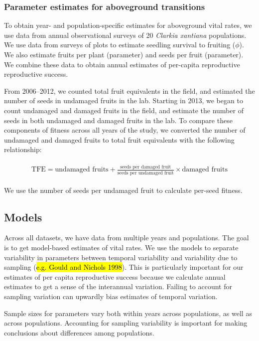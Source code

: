 \documentclass[12pt, oneside, titlepage]{article}   	%
\begin{document}
\subsubsection*{Parameter estimates for aboveground transitions}

To obtain year- and population-specific estimates for aboveground vital rates, we use data from annual observational surveys of 20 \textit{Clarkia xantiana} populations. We use data from surveys of plots to estimate seedling survival to fruiting ($\phi$). We also estimate fruits per plant (parameter) and seeds per fruit (parameter). We combine these data to obtain annual estimates of per-capita reproductive reproductive success.

From 2006--2012, we counted total fruit equivalents in the field, and estimated the number of seeds in undamaged fruits in the lab. Starting in 2013, we began to count undamaged and damaged fruits in the field, and estimate the number of seeds in both undamaged and damaged fruits in the lab. To compare these components of fitness across all years of the study, we converted the number of undamaged and damaged fruits to total fruit equivalents with the following relationship:

%
    \begin{align}
\begin{split}
\textrm{TFE} = \textrm{undamaged fruits} + \frac{\textrm{seeds per damaged fruit}}{\textrm{seeds per undamaged fruit}}\times  \textrm{damaged fruits} 
  \end{split}
\end{align}
%

We use the number of seeds per undamaged fruit to calculate per-seed fitness. 

\subsection*{Models}

Across all datasets, we have data from multiple years and populations. The goal is to get model-based estimates of vital rates. We use the models to separate variability in parameters between temporal variability and variability due to sampling (\hl{e.g. Gould and Nichols 1998}). This is particularly important for our estimates of per capita reproductive success because we calculate annual estimates to get a sense of the interannual variation. Failing to account for sampling variation can upwardly bias estimates of temporal variation. 

Sample sizes for parameters vary both within years across populations, as well as across populations. Accounting for sampling variability is important for making conclusions about differences among populations. 
 
\end{document}
